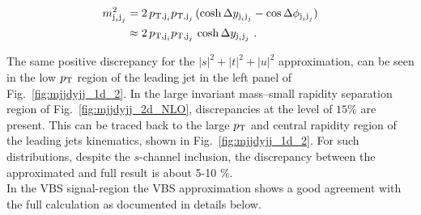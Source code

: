 \begin{equation}
\begin{split}
m_{\text{j}_i\text{j}_j}^2 &= 2\,p_{\text{T},\text{j}_i}p_{\text{T},\text{j}_j}\,(\cosh \Delta y_{\text{j}_i\text{j}_j} - \cos \Delta\phi_{\text{j}_i\text{j}_j}) \\
&\approx 2\,p_{\text{T},\text{j}_i}p_{\text{T},\text{j}_j}\,\cosh \Delta y_{\text{j}_i\text{j}_j} \,\,.
\end{split}
\end{equation}

The same positive discrepancy for the $|s|^2 + |t|^2 + |u|^2$ approximation, can be seen in the low $p_\text{T}$ region of the leading jet in the left panel of Fig.~\ref{fig:mjjdyjj_1d_2}.
In the large invariant mass--small rapidity separation region of Fig.~\ref{fig:mjjdyjj_2d_NLO}, discrepancies at the level of $15\%$ are present.
This can be traced back to the large $p_\text{T}$ and central rapidity region of the leading jets kinematics, shown in Fig.~\ref{fig:mjjdyjj_1d_2}. For such distributions, despite the $s$-channel inclusion, the discrepancy between the approximated and full result is about 5-10 \%.\\
In the VBS signal-region the VBS approximation shows a good agreement with the full calculation as documented in details below.

